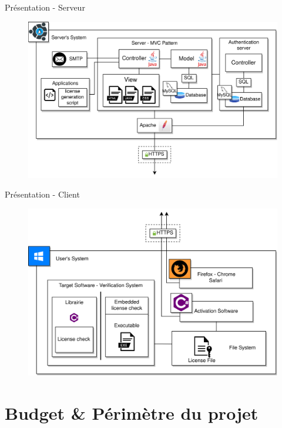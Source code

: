 \documentclass{cubeamer}
\begin{document}
\begin{frame}{Présentation - Serveur}
    \begin{figure}
        \centering 
        \includegraphics[scale=0.7]{img/DAT-server.png}
    \end{figure}
\end{frame}

\begin{frame}{Présentation - Client}
    \begin{figure}
        \centering
        \vspace{-0.8cm}
        \includegraphics[scale=0.72]{img/DAT-client.png}
    \end{figure}
\end{frame}

\section{Budget \& Périmètre du projet}
\end{document}
